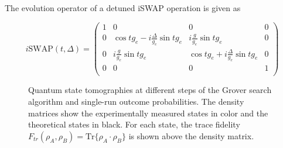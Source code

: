 The evolution operator of a detuned iSWAP operation is given as

\begin{equation}
i\mathrm{SWAP}(t,\Delta) = \left(
			\begin{array}{cccc}
				1 & 0 & 0 & 0 \\
				0 & \cos{t g_{e}}-i\frac{\Delta}{g_{e}}\sin{t g_{e}} & i \frac{g}{g_e}\sin{t g_{e}} & 0 \\
				0 & i\frac{g}{g_e}\sin{t g_{e}} & \cos{t g_{e}}+i\frac{\Delta}{g_{e}}\sin{t g_{e}} & 0 \\
				0 & 0 & 0 & 1 \\
			\end{array}
	\right) \label{eq:swap_with_detuning}
\end{equation}

\begin{figure}
	\centering
	\caption[Quantum state tomographies at different steps during the Grover search algorithm and single-run outcome probabilities]{Quantum state tomographies at different steps of the Grover search algorithm and single-run outcome probabilities. The density matrices show the experimentally measured states in color and the theoretical states in black. For each state, the trace fidelity $F_{tr}(\rho_A,\rho_B) = \mathrm{Tr}\{\rho_A\cdot\rho_B\}$ is shown above the density matrix.}
	\label{fig:grover_error_model}
\end{figure}

